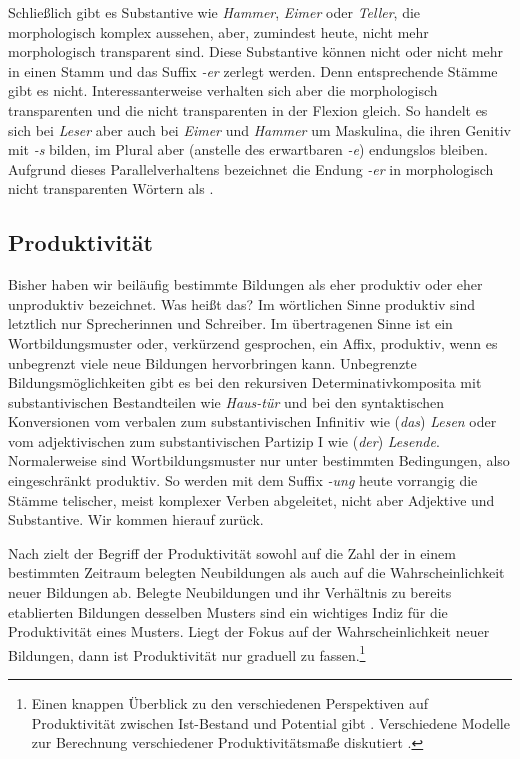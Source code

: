 Schließlich gibt es Substantive wie \textit{Hammer}, \textit{Eimer} oder \textit{Teller}, die morphologisch komplex aussehen, aber, zumindest heute, nicht mehr morphologisch transparent sind. Diese Substantive können nicht oder nicht mehr in einen Stamm und das Suffix \textit{-er} zerlegt werden. Denn entsprechende Stämme gibt es nicht. Interessanterweise verhalten sich aber die morphologisch transparenten und die nicht transparenten in der Flexion gleich. So handelt es sich bei \textit{Leser} aber auch bei \textit{Eimer} und \textit{Hammer} um Maskulina, die ihren Genitiv mit \textit{-s} bilden, im Plural aber (anstelle des erwartbaren \textit{-e}) endungslos bleiben. Aufgrund dieses Parallelverhaltens bezeichnet \citet[228]{Eisenberg2020_Wort} die Endung \textit{-er} in morphologisch nicht transparenten Wörtern als .


\subsection{Produktivität}\label{subsection:Produktivität}

Bisher haben wir beiläufig bestimmte Bildungen als eher produktiv oder eher unproduktiv bezeichnet. Was heißt das? Im wörtlichen Sinne produktiv sind letztlich nur Sprecherinnen und Schreiber. Im übertragenen Sinne ist ein Wortbildungsmuster oder, verkürzend gesprochen, ein Affix, produktiv, wenn es unbegrenzt viele neue Bildungen hervorbringen kann. Unbegrenzte Bildungsmöglichkeiten gibt es \zB bei den rekursiven Determinativkomposita mit substantivischen Bestandteilen wie \textit{Haus-tür} und bei den syntaktischen Konversionen vom verbalen zum substantivischen Infinitiv wie (\textit{das}) \textit{Lesen} oder vom adjektivischen zum substantivischen Partizip I wie (\textit{der}) \textit{Lesende}. Normalerweise sind Wortbildungsmuster nur unter bestimmten Bedingungen, also eingeschränkt produktiv. So werden mit dem Suffix \textit{-ung} heute vorrangig die Stämme telischer, meist komplexer Verben abgeleitet, nicht aber Adjektive und Substantive. Wir kommen hierauf zurück. 

Nach \citet[205--211]{Bauer2001} zielt der Begriff der Produktivität sowohl auf die Zahl der in einem bestimmten Zeitraum belegten Neubildungen als auch auf die Wahrscheinlichkeit neuer Bildungen ab. Belegte Neubildungen und ihr Verhältnis zu bereits etablierten Bildungen desselben Musters sind ein wichtiges Indiz für die Produktivität eines Musters. Liegt der Fokus auf der Wahrscheinlichkeit neuer Bildungen, dann ist Produktivität nur graduell zu fassen.\footnote{Einen knappen Überblick zu den verschiedenen Perspektiven auf Produktivität zwischen Ist-Bestand und Potential gibt \citet{Plag2006}. Verschiedene Modelle zur Berechnung verschiedener Produktivitätsmaße diskutiert \citet{Baayen2009}.}


